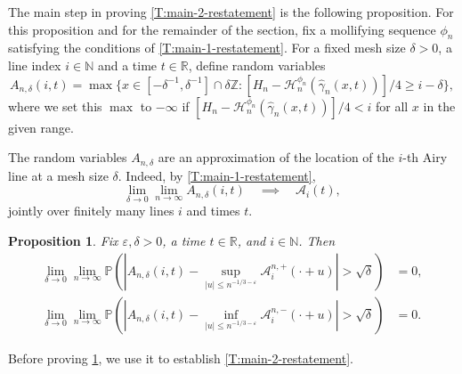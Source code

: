 \documentclass[11pt,twoside]{amsart}
\theoremstyle{plain}
\newtheorem{prop}[thm]{Proposition}
\numberwithin{quest}{section}
\theoremstyle{remark}
\numberwithin{rem}{section}
\theoremstyle{definition}
\newcommand{\eps}{\varepsilon}
\newcommand{\Z}{\mathbb{Z}}
\newcommand{\N}{\mathbb{N}}
\newcommand{\R}{\mathbb{R}}
\renewcommand{\P}{\mathbb{P}}
\newcommand{\cA}{\mathcal{A}}
\newcommand{\cH}{\mathcal{H}}
\begin{document}
	
	The main step in proving \cref{T:main-2-restatement} is the following proposition. For this proposition and for the remainder of the section, fix a mollifying sequence $\phi_n$ satisfying the conditions of \cref{T:main-1-restatement}. For a fixed mesh size $\delta > 0$, a line index $i \in \N$ and a time $t \in \R$, define random variables 
	$$
	A_{n, \delta}(i, t) = \max \{x \in [-\delta^{-1}, \delta^{-1}] \cap \delta \Z : [H_n - \cH_n^{\phi_n}(\hat \gamma_n(x, t))]/4 \ge i - \delta \}, 
	$$
	where we set this $\max$ to $-\infty$ if $[H_n - \cH_n^{\phi_n}(\hat \gamma_n(x, t))]/4 < i$ for all $x$ in the given range.
	
	The random variables $A_{n, \delta}$ are an approximation of the location of the $i$-th Airy line at a mesh size $\delta$. Indeed, by \cref{T:main-1-restatement}, 
	$$
	\lim_{\delta \to 0} \lim_{n \to \infty} A_{n, \delta}(i, t) \quad \implies \quad \cA_i(t),
	$$
	jointly over finitely many lines $i$ and times $t$.
	\begin{prop}
		\label{P:key-prop}
		Fix $\eps, \delta > 0$, a time $t \in \R$, and $i \in \N$. Then
		\begin{align*}
			\lim_{\delta \to 0} \lim_{n \to \infty} \P(|A_{n, \delta}(i, t) - \sup_{|u| \le n^{-1/3-\eps}} \cA_i^{n, +}(\cdot + u)| > \sqrt{\delta}) &= 0, \\
			\lim_{\delta \to 0} \lim_{n \to \infty} \P(|A_{n, \delta}(i, t) - \inf_{|u| \le n^{-1/3 -\eps}} \cA_i^{n, -}(\cdot + u)| > \sqrt{\delta}) &= 0.
		\end{align*}
	\end{prop}
	
	Before proving \cref{P:key-prop}, we use it to establish \cref{T:main-2-restatement}.
	
\end{document}
